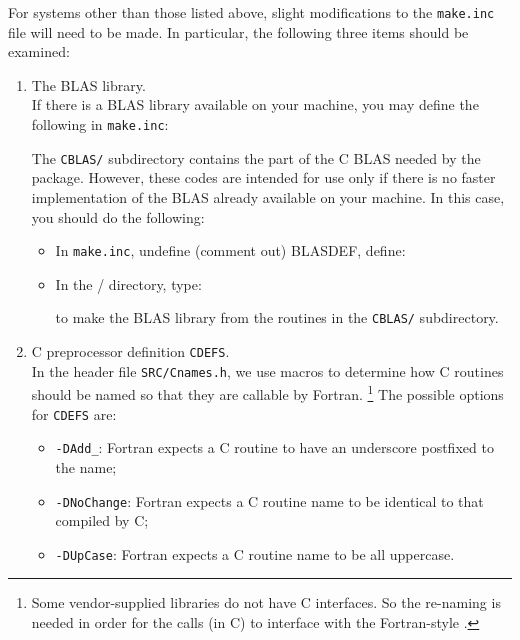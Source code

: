 For systems other than those listed above, slight modifications to the 
{\tt make.inc} file will need to be made. In particular, 
the following three items should be examined:
\begin{enumerate}
\item The BLAS library.\\
   If there is a BLAS library available on your machine, you may define
   the following in {\tt make.inc}:

   \hspace{.4in}{\tt BLASDEF = -DUSE\_VENDOR\_BLAS}

   \vspace{-6pt}
   \hspace{.4in}{\tt BLASLIB = <BLAS library you wish to link with>}

   The {\tt CBLAS/} subdirectory contains the part of the C BLAS needed by 
   the {\SuperLU} package. However, these codes are intended for use
   only if there is no faster implementation of the BLAS already available
   on your machine. In this case, you should do the following:
   \begin{itemize}
   \item[1)] In {\tt make.inc}, undefine (comment out) BLASDEF, define:

          \hspace{.4in}{\tt BLASLIB = ../blas\$(PLAT).a}

   \item[2)] In the {\SuperLU/} directory, type:

          \hspace{.4in}{\tt make blaslib}

          to make the BLAS library from the routines in the {\tt CBLAS/}
	  subdirectory.
   \end{itemize}
   
\item C preprocessor definition {\tt CDEFS}.\\
   In the header file {\tt SRC/Cnames.h}, we use macros to determine how
   C routines should be named so that they are callable by Fortran.%
   \footnote{Some vendor-supplied {\BLAS} libraries do not have C 
   interfaces. So the re-naming is needed in order for the {\SuperLU} {\BLAS}
   calls (in C) to interface with the Fortran-style {\BLAS}.}
   The possible options for {\tt CDEFS} are:
   \begin{itemize}
   \item {\tt -DAdd\_}: Fortran expects a C routine to have an underscore
                        postfixed to the name;
   \item {\tt -DNoChange}: Fortran expects a C routine name to be identical
                        to that compiled by C;
   \item {\tt -DUpCase}: Fortran expects a C routine name to be all uppercase.
   \end{itemize}


\end{enumerate}
